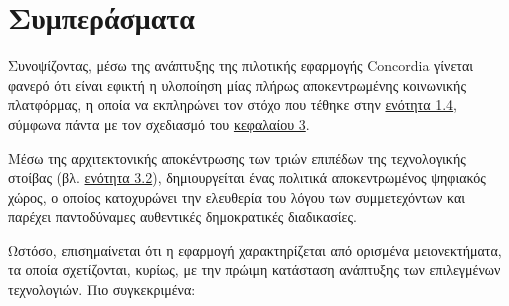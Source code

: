 \section{Συμπεράσματα}\label{section:5-1-conclusions}

Συνοψίζοντας, μέσω της ανάπτυξης της πιλοτικής εφαρμογής Concordia γίνεται φανερό ότι είναι εφικτή η υλοποίηση μίας πλήρως αποκεντρωμένης κοινωνικής πλατφόρμας, η οποία να εκπληρώνει τον στόχο που τέθηκε στην \hyperref[section:1-4-thesis-goal]{ενότητα 1.4}, σύμφωνα πάντα με τον σχεδιασμό του \hyperref[chapter:3-application-design]{κεφαλαίου 3}.

Μέσω της αρχιτεκτονικής αποκέντρωσης των τριών επιπέδων της τεχνολογικής στοίβας (βλ. \hyperref[section:3-2-technology-stack]{ενότητα 3.2}), δημιουργείται ένας πολιτικά αποκεντρωμένος ψηφιακός χώρος, ο οποίος κατοχυρώνει την ελευθερία του λόγου των συμμετεχόντων και παρέχει παντοδύναμες αυθεντικές δημοκρατικές διαδικασίες.

Ωστόσο, επισημαίνεται ότι η εφαρμογή χαρακτηρίζεται από ορισμένα μειονεκτήματα, τα οποία σχετίζονται, κυρίως, με την πρώιμη κατάσταση ανάπτυξης των επιλεγμένων τεχνολογιών. Πιο συγκεκριμένα:


